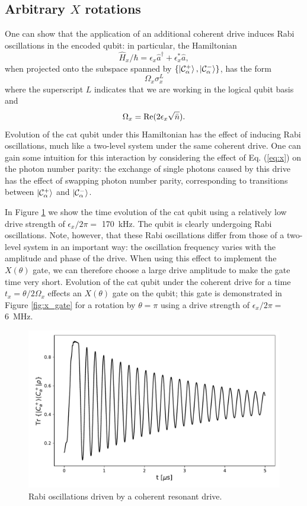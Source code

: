 \subsection{Arbitrary $X$ rotations}

One can show that the application of an additional coherent drive induces Rabi oscillations in the encoded qubit: in particular, the Hamiltonian
\begin{equation} \label{eq:x}
    \hat{H}_x / \hbar = \epsilon_x \hat{a}^\dag + \epsilon_x^* \hat{a},
\end{equation}
when projected onto the subspace spanned by $\{ \ket{\mathcal{C}_\alpha^+}, \ket{\mathcal{C}_\alpha^-}\}$, has the form \cite{grimm_2020,mirrahimi_2014}
\[
    \Omega_x \sigma_x^L
\]
where the superscript $L$ indicates that we are working in the logical qubit basis and
\[
    \Omega_x = {\rm Re}(2 \epsilon_x \sqrt{\bar{n}}).
\]
Evolution of the cat qubit under this Hamiltonian has the effect of inducing Rabi oscillations, much like a two-level system under the same coherent drive.
One can gain some intuition for this interaction by considering the effect of Eq. (\ref{eq:x}) on the photon number parity: the exchange of single photons caused by this drive has the effect of swapping photon number parity, corresponding to transitions between $\ket{\mathcal{C}_\alpha^+}$ and $\ket{\mathcal{C}_\alpha^-}$.

In Figure \ref{fig:rabi} we show the time evolution of the cat qubit using a relatively low drive strength of $\epsilon_x / 2 \pi =$ \SI{170}{\kHz}.
The qubit is clearly undergoing Rabi oscillations.
Note, however, that these Rabi oscillations differ from those of a two-level system in an important way: the oscillation frequency varies with the amplitude and phase of the drive.
When using this effect to implement the $X(\theta)$ gate, we can therefore choose a large drive amplitude to make the gate time very short.
Evolution of the cat qubit under the coherent drive for a time $t_x = \theta / 2 \Omega_x$ effects an $X(\theta)$ gate on the qubit; this gate is demonstrated in Figure \ref{fig:x_gate} for a rotation by $\theta = \pi$ using a drive strength of $\epsilon_x / 2 \pi =$ \SI{6}{\MHz}.

\begin{figure}[t]
    \centering
    \includegraphics[width=\columnwidth]{figures/rabi.pdf}
    \caption{Rabi oscillations driven by a coherent resonant drive.}
    \label{fig:rabi}
\end{figure}

